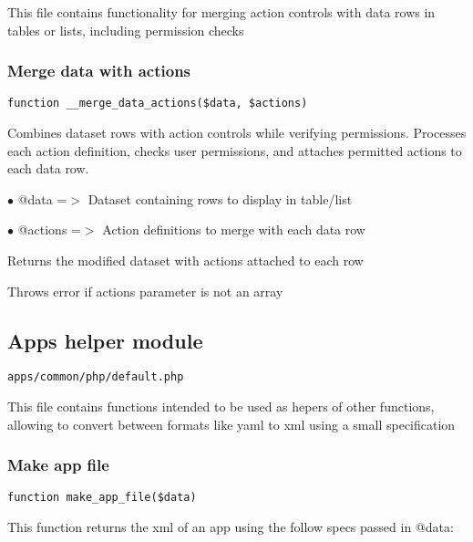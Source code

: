 \documentclass[a4paper]{article}
\begin{document}
This file contains functionality for merging action controls
with data rows in tables or lists, including permission checks

\hypertarget{toc26}{}
\subsubsection{Merge data with actions}

\begin{lstlisting}
function __merge_data_actions($data, $actions)
\end{lstlisting}

Combines dataset rows with action controls while verifying permissions.
Processes each action definition, checks user permissions, and attaches
permitted actions to each data row.

\begin{compactitem}
\item[\color{myblue}$\bullet$] @data    =$>$ Dataset containing rows to display in table/list
\item[\color{myblue}$\bullet$] @actions =$>$ Action definitions to merge with each data row
\end{compactitem}

Returns the modified dataset with actions attached to each row

Throws error if actions parameter is not an array

\hypertarget{toc27}{}
\subsection{Apps helper module}

\begin{lstlisting}
apps/common/php/default.php
\end{lstlisting}

This file contains functions intended to be used as hepers of other functions,
allowing to convert between formats like yaml to xml using a small specification

\hypertarget{toc28}{}
\subsubsection{Make app file}

\begin{lstlisting}
function make_app_file($data)
\end{lstlisting}

This function returns the xml of an app using the follow specs passed in @data:
\end{document}
